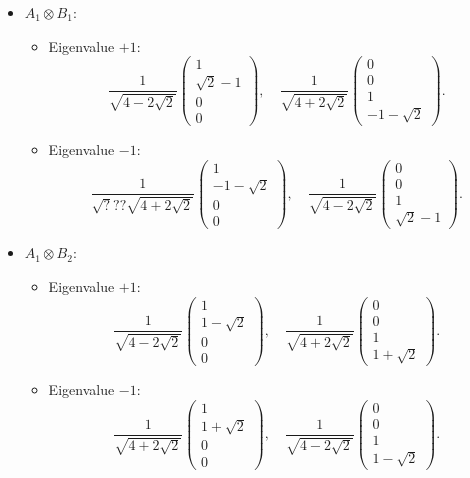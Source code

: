 \documentclass{article}
\begin{document}
\begin{itemize}
    \item \( A_1 \otimes B_1 \):
    \begin{itemize}
        \item Eigenvalue \( +1 \):
        \[
        \frac{1}{\sqrt{4-2\sqrt{2}}} \begin{pmatrix} 1 \\ \sqrt{2}-1 \\ 0 \\ 0 \end{pmatrix}, \quad \frac{1}{\sqrt{4+2\sqrt{2}}} \begin{pmatrix} 0 \\ 0 \\ 1 \\ -1-\sqrt{2} \end{pmatrix}.
        \]
        \item Eigenvalue \( -1 \):
        \[
        \frac{1}{\sqrt??? \sqrt{4+2\sqrt{2}}} \begin{pmatrix} 1 \\ -1-\sqrt{2} \\ 0 \\ 0 \end{pmatrix}, \quad \frac{1}{\sqrt{4-2\sqrt{2}}} \begin{pmatrix} 0 \\ 0 \\ 1 \\ \sqrt{2}-1 \end{pmatrix}.
        \]
    \end{itemize}
    \item \( A_1 \otimes B_2 \):
    \begin{itemize}
        \item Eigenvalue \( +1 \):
        \[
        \frac{1}{\sqrt{4-2\sqrt{2}}} \begin{pmatrix} 1 \\ 1-\sqrt{2} \\ 0 \\ 0 \end{pmatrix}, \quad \frac{1}{\sqrt{4+2\sqrt{2}}} \begin{pmatrix} 0 \\ 0 \\ 1 \\ 1+\sqrt{2} \end{pmatrix}.
        \]
        \item Eigenvalue \( -1 \):
        \[
        \frac{1}{\sqrt{4+2\sqrt{2}}} \begin{pmatrix} 1 \\ 1+\sqrt{2} \\ 0 \\ 0 \end{pmatrix}, \quad \frac{1}{\sqrt{4-2\sqrt{2}}} \begin{pmatrix} 0 \\ 0 \\ 1 \\ 1-\sqrt{2} \end{pmatrix}.
\]
\end{itemize}
\end{itemize}
\end{document}
